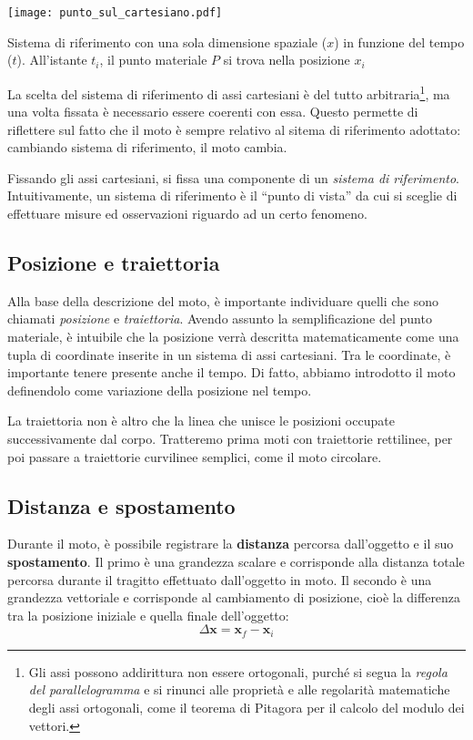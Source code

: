 \begin{marginfigure}
    \centering
    \texttt{[image: punto\_sul\_cartesiano.pdf]}
    \caption{Sistema di riferimento con una sola dimensione spaziale ($x$)
    in funzione del tempo ($t$). All'istante $t_i$, il punto materiale $P$
    si trova nella posizione $x_i$}
    \label{point}
\end{marginfigure}

La scelta del sistema di riferimento di assi cartesiani è del tutto arbitraria\footnote{
Gli assi possono addirittura non essere ortogonali, purché si segua la \textit{regola del
parallelogramma} e si rinunci alle proprietà e alle regolarità matematiche degli
assi ortogonali, come il teorema di Pitagora per il calcolo del modulo dei
vettori.}, ma una volta fissata è necessario essere coerenti con essa.
Questo permette di riflettere sul fatto che il moto è sempre relativo al sitema di
riferimento adottato: cambiando sistema di riferimento, il moto cambia.

Fissando gli assi cartesiani, si fissa una componente di un \textit{sistema di
riferimento}. Intuitivamente, un sistema di riferimento è il ``punto di vista''
da cui si sceglie di effettuare misure ed osservazioni riguardo ad un certo
fenomeno.

\subsection*{Posizione e traiettoria}
Alla base della descrizione del moto, è importante individuare quelli che sono
chiamati \textit{posizione} e \textit{traiettoria}. Avendo assunto la semplificazione
del punto materiale, è intuibile che la posizione verrà descritta matematicamente
come una tupla di coordinate inserite in un sistema di assi cartesiani. Tra le
coordinate, è importante tenere presente anche il tempo. Di fatto, abbiamo
introdotto il moto definendolo come variazione della posizione nel tempo.

La traiettoria non è altro che la linea che unisce le posizioni occupate
successivamente dal corpo. Tratteremo prima moti con traiettorie rettilinee,
per poi passare a traiettorie curvilinee semplici, come il moto circolare.


\subsection*{Distanza e spostamento}
Durante il moto, è possibile registrare la \textbf{distanza} percorsa
dall'oggetto e il suo \textbf{spostamento}. Il primo è una grandezza
scalare e corrisponde alla distanza totale percorsa durante il tragitto
effettuato dall'oggetto in moto. Il secondo è una grandezza vettoriale e
corrisponde al cambiamento di posizione,
cioè la differenza tra la posizione iniziale e quella finale dell'oggetto:
\[ \Delta \mathbf{x} = \mathbf{x}_f - \mathbf{x}_i \]


